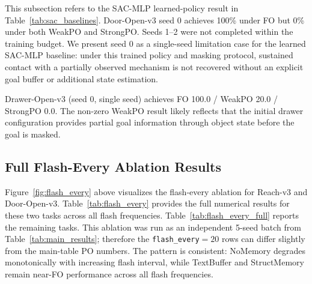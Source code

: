 This subsection refers to the SAC-MLP learned-policy result in Table~\ref{tab:sac_baselines}. Door-Open-v3 seed 0 achieves 100\% under FO but 0\% under both WeakPO and StrongPO. Seeds 1--2 were not completed within the training budget. We present seed 0 as a single-seed limitation case for the learned SAC-MLP baseline: under this trained policy and masking protocol, sustained contact with a partially observed mechanism is not recovered without an explicit goal buffer or additional state estimation.

Drawer-Open-v3 (seed 0, single seed) achieves FO 100.0 / WeakPO 20.0 / StrongPO 0.0. The non-zero WeakPO result likely reflects that the initial drawer configuration provides partial goal information through object state before the goal is masked.

\subsection{Full Flash-Every Ablation Results}

Figure~\ref{fig:flash_every} above visualizes the flash-every ablation for Reach-v3 and Door-Open-v3. Table~\ref{tab:flash_every} provides the full numerical results for these two tasks across all flash frequencies. Table~\ref{tab:flash_every_full} reports the remaining tasks. This ablation was run as an independent 5-seed batch from Table~\ref{tab:main_results}; therefore the \texttt{flash\_every}$=20$ rows can differ slightly from the main-table PO numbers. The pattern is consistent: NoMemory degrades monotonically with increasing flash interval, while TextBuffer and StructMemory remain near-FO performance across all flash frequencies.

